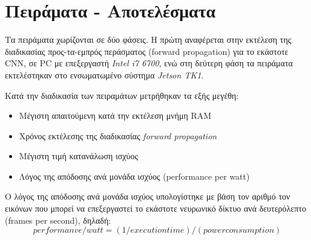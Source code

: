 \chapter{Πειράματα - Αποτελέσματα}
\label{chapter:experiments}

Τα πειράματα χωρίζονται σε δύο φάσεις. Η πρώτη αναφέρεται στην εκτέλεση
της διαδικασίας προς-τα-εμπρός περάσματος (forward propagation) για το εκάστοτε
CNN, σε PC με επεξεργαστή \emph{Intel i7 6700}, ενώ στη δεύτερη φάση τα πειράματα εκτελέστηκαν στο
ενσωματωμένο σύστημα \emph{Jetson TK1}.

Κατά την διαδικασία των πειραμάτων μετρήθηκαν τα εξής μεγέθη:
\begin{itemize}
  \item{Μέγιστη απαιτούμενη κατά την εκτέλεση μνήμη RAM}
  \item{Χρόνος εκτέλεσης της διαδικασίας \emph{forward propagation}}
  \item{Μέγιστη τιμή κατανάλωση ισχύος}
  \item{Λόγος της απόδοσης ανά μονάδα ισχύος (performance per watt)}
\end{itemize}

Ο λόγος της απόδοσης ανά μονάδα ισχύος υπολογίστηκε
με βάση τον αριθμό τον εικόνων που μπορεί να επεξεργαστεί το εκάστοτε
νευρωνικό δίκτυο ανά δευτερόλεπτο (frames per second), δηλαδή:
\begin{equation*}
  performanve / watt = (1 / execution time) / (power consumption)
\end{equation*}



